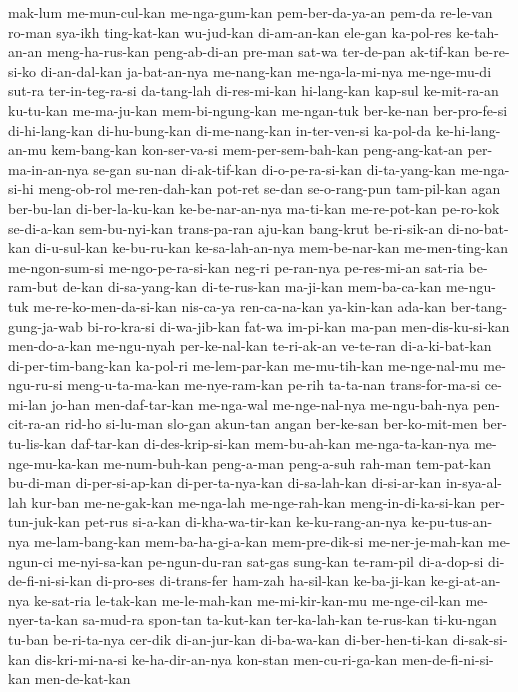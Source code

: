 {mak-lum me-mun-cul-kan me-nga-gum-kan pem-ber-da-ya-an pem-da re-le-van ro-man sya-ikh
ting-kat-kan wu-jud-kan di-am-an-kan ele-gan ka-pol-res ke-tah-an-an meng-ha-rus-kan peng-ab-di-an
pre-man sat-wa ter-de-pan ak-tif-kan be-re-si-ko di-an-dal-kan ja-bat-an-nya me-nang-kan
me-nga-la-mi-nya me-nge-mu-di sut-ra ter-in-teg-ra-si da-tang-lah di-res-mi-kan hi-lang-kan kap-sul
ke-mit-ra-an ku-tu-kan me-ma-ju-kan mem-bi-ngung-kan me-ngan-tuk ber-ke-nan ber-pro-fe-si di-hi-lang-kan
di-hu-bung-kan di-me-nang-kan in-ter-ven-si ka-pol-da ke-hi-lang-an-mu kem-bang-kan kon-ser-va-si mem-per-sem-bah-kan
peng-ang-kat-an per-ma-in-an-nya se-gan su-nan di-ak-tif-kan di-o-pe-ra-si-kan di-ta-yang-kan me-nga-si-hi
meng-ob-rol me-ren-dah-kan pot-ret se-dan se-o-rang-pun tam-pil-kan agan ber-bu-lan
di-ber-la-ku-kan ke-be-nar-an-nya ma-ti-kan me-re-pot-kan pe-ro-kok se-di-a-kan sem-bu-nyi-kan trans-pa-ran
aju-kan bang-krut be-ri-sik-an di-no-bat-kan di-u-sul-kan ke-bu-ru-kan ke-sa-lah-an-nya mem-be-nar-kan
me-men-ting-kan me-ngon-sum-si me-ngo-pe-ra-si-kan neg-ri pe-ran-nya pe-res-mi-an sat-ria be-ram-but
de-kan di-sa-yang-kan di-te-rus-kan ma-ji-kan mem-ba-ca-kan me-ngu-tuk me-re-ko-men-da-si-kan nis-ca-ya
ren-ca-na-kan ya-kin-kan ada-kan ber-tang-gung-ja-wab bi-ro-kra-si di-wa-jib-kan fat-wa im-pi-kan
ma-pan men-dis-ku-si-kan men-do-a-kan me-ngu-nyah per-ke-nal-kan te-ri-ak-an ve-te-ran di-a-ki-bat-kan
di-per-tim-bang-kan ka-pol-ri me-lem-par-kan me-mu-tih-kan me-nge-nal-mu me-ngu-ru-si meng-u-ta-ma-kan me-nye-ram-kan
pe-rih ta-ta-nan trans-for-ma-si ce-mi-lan jo-han men-daf-tar-kan me-nga-wal me-nge-nal-nya
me-ngu-bah-nya pen-cit-ra-an rid-ho si-lu-man slo-gan akun-tan angan ber-ke-san
ber-ko-mit-men ber-tu-lis-kan daf-tar-kan di-des-krip-si-kan mem-bu-ah-kan me-nga-ta-kan-nya me-nge-mu-ka-kan me-num-buh-kan
peng-a-man peng-a-suh rah-man tem-pat-kan bu-di-man di-per-si-ap-kan di-per-ta-nya-kan di-sa-lah-kan
di-si-ar-kan in-sya-al-lah kur-ban me-ne-gak-kan me-nga-lah me-nge-rah-kan meng-in-di-ka-si-kan per-tun-juk-kan
pet-rus si-a-kan di-kha-wa-tir-kan ke-ku-rang-an-nya ke-pu-tus-an-nya me-lam-bang-kan mem-ba-ha-gi-a-kan mem-pre-dik-si
me-ner-je-mah-kan me-ngun-ci me-nyi-sa-kan pe-ngun-du-ran sat-gas sung-kan te-ram-pil di-a-dop-si
di-de-fi-ni-si-kan di-pro-ses di-trans-fer ham-zah ha-sil-kan ke-ba-ji-kan ke-gi-at-an-nya ke-sat-ria
le-tak-kan me-le-mah-kan me-mi-kir-kan-mu me-nge-cil-kan me-nyer-ta-kan sa-mud-ra spon-tan ta-kut-kan
ter-ka-lah-kan te-rus-kan ti-ku-ngan tu-ban be-ri-ta-nya cer-dik di-an-jur-kan di-ba-wa-kan
di-ber-hen-ti-kan di-sak-si-kan dis-kri-mi-na-si ke-ha-dir-an-nya kon-stan men-cu-ri-ga-kan men-de-fi-ni-si-kan men-de-kat-kan
}
